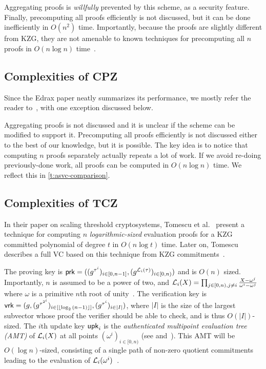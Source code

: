 Aggregating proofs is \textit{willfully} prevented by this scheme, as a security feature.
Finally, precomputing all proofs efficiently is not discussed, but it can be done inefficiently in $O(n^2)$ time.
Importantly, because the proofs are slightly different from KZG, they are not amenable to known techniques for precomputing all $n$ proofs in $O(n\log{n})$ time~\cite{FK20}.

\subsection{Complexities of CPZ~\cite{CPZ18}}
\label{s:complexity:cpz}

Since the Edrax paper neatly summarizes its performance, we mostly refer the reader to~\cite[Table 1]{CPZ18}, with one exception discussed below.

Aggregating proofs is not discussed and it is unclear if the scheme can be modified to support it.
Precomputing all proofs efficiently is not discussed either to the best of our knowledge, but it is possible.
The key idea is to notice that computing $n$ proofs separately actually repeats a lot of work.
If we avoid re-doing previously-done work, all proofs can be computed in $O(n\log{n})$ time.
We reflect this in \cref{t:asvc-comparison}.

\subsection{Complexities of TCZ~\cite{TCZ+20,Tomescu20}}
\label{s:complexity-tcz}

In their paper on scaling threshold cryptosystems, Tomescu et al.~\cite{TCZ+20} present a technique for computing $n$ \textit{logarithmic-sized} evaluation proofs for a KZG committed polynomial of degree $t$ in $O(n\log{t})$ time.
Later on, Tomescu describes a full VC based on this technique from KZG commitments~\cite[Sec  9.2]{Tomescu20}.

The proving key is $\mathsf{prk}=((g^{\tau^i})_{i\in [0,n-1]},(g^{\mathcal{L}_i(\tau)})_{i\in [0,n)})$ and is $O(n)$ sized.
Importantly, $n$ is assumed to be a power of two, and $\mathcal{L}_i(X)=\prod_{j\in [0,n),j\ne i} \frac{X-\omega^j}{\omega^i - \omega^j}$ where $\omega$ is a primitive $n$th root of unity~\cite{vG13ModernCh8}.
The verification key is $\mathsf{vrk}=(g,(g^{\tau^{2^i}})_{i\in [\lfloor\log_2{(n-1)}\rfloor]}, (g^{\tau^i})_{i\in |I|})$, where $|I|$ is the size of the largest subvector whose proof the verifier should be able to check, and is thus $O(|I|)$-sized.
The $i$th update key $\mathsf{upk}_i$ is the \textit{authenticated multipoint evaluation tree (AMT)} of $\mathcal{L}_i(X)$ at all points $(\omega^i)_{i\in [0,n)}$ (see \cite[Sec III-B]{TCZ+20} and~\cite[Ch 9]{Tomescu20}).
This AMT will be $O(\log{n})$-sized, consisting of a single path of non-zero quotient commitments leading to the evaluation of $\mathcal{L}_i(\omega^i)$~\cite[Sec 9.2.2]{Tomescu20}.

